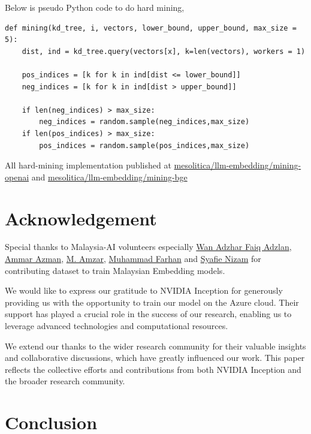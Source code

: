 \documentclass[preprint]{article}
\begin{document}
Below is pseudo Python code to do hard mining,

\begin{lstlisting}[breaklines=true]
def mining(kd_tree, i, vectors, lower_bound, upper_bound, max_size = 5):
    dist, ind = kd_tree.query(vectors[x], k=len(vectors), workers = 1)

    pos_indices = [k for k in ind[dist <= lower_bound]]
    neg_indices = [k for k in ind[dist > upper_bound]]

    if len(neg_indices) > max_size:
        neg_indices = random.sample(neg_indices,max_size)
    if len(pos_indices) > max_size:
        pos_indices = random.sample(pos_indices,max_size)
\end{lstlisting}

All hard-mining implementation published at \href{https://github.com/mesolitica/llm-embedding/tree/main/mining-openai}{mesolitica/llm-embedding/mining-openai} and \href{https://github.com/mesolitica/llm-embedding/tree/main/mining-bge}{mesolitica/llm-embedding/mining-bge}

\section{Acknowledgement}

Special thanks to Malaysia-AI volunteers especially \href{https://www.linkedin.com/in/wan-adzhar-faiq-adzlan-19a27baa/}{Wan Adzhar Faiq Adzlan}, \href{https://www.linkedin.com/in/ammar-azman/}{Ammar Azman}, \href{https://www.linkedin.com/in/amzar96/}{M. Amzar}, \href{https://www.linkedin.com/in/muhammad-farhan-helmy-0529501a7/}{Muhammad Farhan} and \href{https://www.linkedin.com/in/syafie-nizam/}{Syafie Nizam} for contributing dataset to train Malaysian Embedding models.

We would like to express our gratitude to NVIDIA Inception for generously providing us with the opportunity to train our model on the Azure cloud. Their support has played a crucial role in the success of our research, enabling us to leverage advanced technologies and computational resources.

We extend our thanks to the wider research community for their valuable insights and collaborative discussions, which have greatly influenced our work. This paper reflects the collective efforts and contributions from both NVIDIA Inception and the broader research community.

\section{Conclusion}
\end{document}
